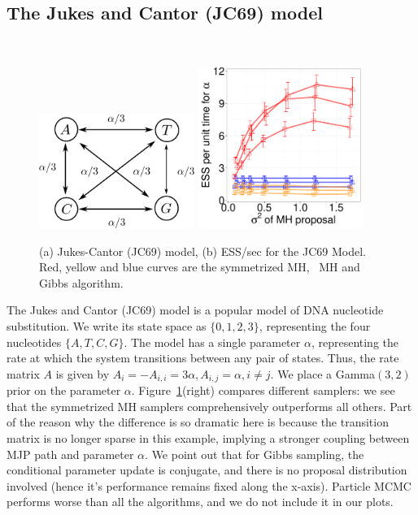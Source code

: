 {  \subsection{The Jukes and Cantor (JC69) model}~
  \begin{figure}%
  \begin{minipage}[!hp]{0.75\linewidth}
    \includegraphics[width=0.45\textwidth, angle=0]{figs/jc_model.pdf}
    \includegraphics[width=0.48\textwidth, angle=0]{figures_new_apr12/JC_18apr12.pdf}
     \label{fig:ESS_JC}
  \end{minipage}
  \begin{minipage}[!hp]{0.23\linewidth}
  \caption{(a) Jukes-Cantor (JC69) model, (b)
    ESS/sec for the JC69 Model. Red, yellow and blue curves are the 
      symmetrized MH, \naive\ MH and Gibbs algorithm. }
  \end{minipage}
  \end{figure}
  The Jukes and Cantor (JC69) model is a popular model of DNA nucleotide
  substitution.  We write its state space as $\{0, 1, 2, 3\}$, representing the 
  four nucleotides $\{A, T, C, G\}$.  The model has a single parameter $\alpha$, 
  representing the rate at which the system transitions between any pair of 
  states. Thus, the rate matrix $A$ is given by 
$A_i = -A_{i,i} = 3\alpha, A_{i, j} = \alpha,i \neq j.$
We place a Gamma$(3,2)$ prior on the parameter $\alpha$.
Figure~\ref{fig:ESS_JC}(right) compares different samplers: we see that the
symmetrized MH samplers comprehensively outperforms all others.
Part of the reason why the difference is so dramatic here is because the
transition matrix is no longer sparse in this example, implying a stronger
coupling between MJP path and parameter $\alpha$. We point out that for Gibbs
sampling, the conditional parameter update is conjugate, and there is no
proposal distribution involved (hence it's performance remains fixed along
the x-axis). Particle MCMC performs worse
than all the algorithms, and we do not include it in our plots.

}
